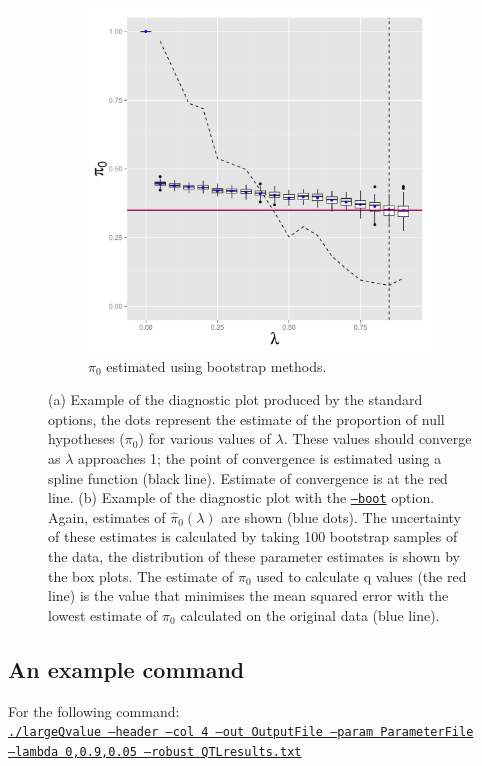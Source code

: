 \documentclass{amsart}
\begin{document}
\begin{figure}
\begin{subfigure}[b]{0.5\textwidth}
    \includegraphics[width=\textwidth]{boot_diagnostic}
   \caption{$\pi_0$ estimated using bootstrap methods.}
   \label{fig:boot_param}
  \end{subfigure}
    \caption{(a) Example of the diagnostic plot produced by the standard
      options, the dots represent the estimate of the proportion of
      null hypotheses ($\pi_0$) for various values of $\lambda$. These
      values should converge as $\lambda$ approaches 1; the point of
      convergence is estimated using a spline function (black
     line). Estimate of convergence is at the red line. (b) Example of the diagnostic plot with the \underline{\texttt{--boot}}
      option. Again, estimates of $\hat{\pi}_0(\lambda)$ are shown (blue dots). The uncertainty of these estimates
      is calculated by taking 100 bootstrap samples of the data, the
      distribution of these parameter estimates is shown by the box
      plots. The estimate of $\pi_0$ used to calculate q values (the
      red line) is the value that minimises the mean squared error
      with the lowest estimate of $\pi_0$ calculated on the original
      data (blue line).}
\label{fig:diagplot}
\end{figure}

\subsection{An example command}
For the following command:\\
\texttt{\underline{./largeQvalue --header --col 4 --out OutputFile --param ParameterFile}\\ 
\underline{--lambda 0,0.9,0.05 --robust QTLresults.txt}}
\end{document}

